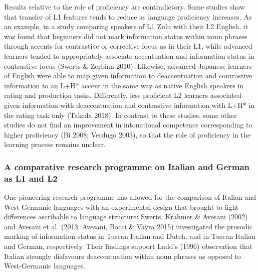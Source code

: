 \begin{styleStandard}
Results relative to the role of proficiency are contradictory. Some studies show that transfer of L1 features tends to reduce as language proficiency increases. As an example, in a study comparing speakers of L1 Zulu with their L2 English, it was found that beginners did not mark information status within noun phrases through accents for contrastive or corrective focus as in their L1, while advanced learners tended to appropriately associate accentuation and information status in contrastive focus (Swerts \& Zerbian 2010). Likewise, advanced Japanese learners of English were able to map given information to deaccentuation and contrastive information to an L+H* accent in the same way as native English speakers in rating and production tasks. Differently, less proficient L2 learners associated given information with deaccentuation and contrastive information with L+H* in the rating task only (Takeda 2018). In contrast to these studies, some other studies do not find an improvement in intonational competence corresponding to higher proficiency (Bi 2008; Verdugo 2003), so that the role of proficiency in the learning process remains unclear.
\end{styleStandard}

\subsubsection{A comparative research programme on Italian and German as L1 and L2}
\hypertarget{Toc191305890}{}\begin{styleStandard}
One pioneering research programme has allowed for the comparison of Italian and West-Germanic languages with an experimental design that brought to light differences ascribable to language structure: Swerts, Krahmer \& Avesani (2002) and Avesani et al. (2013; Avesani, Bocci \& Vayra 2015) investigated the prosodic marking of information status in Tuscan Italian and Dutch, and in Tuscan Italian and German, respectively. Their findings support Ladd’s (1996) observation that Italian strongly disfavours deaccentuation within noun phrases as opposed to West-Germanic languages.
\end{styleStandard}

